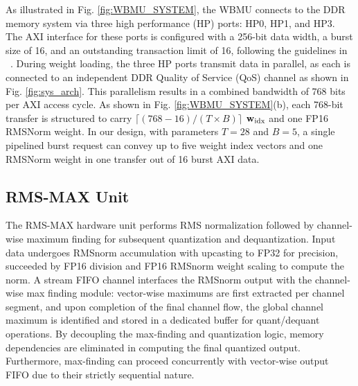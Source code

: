 \documentclass[sigconf]{acmart}
\begin{document}
As illustrated in Fig. \ref{fig:WBMU_SYSTEM}, the WBMU connects to the DDR memory system via three high performance (HP) ports: HP0, HP1, and HP3. The AXI interface for these ports is configured with a 256-bit data width, a burst size of 16, and an outstanding transaction limit of 16, following the guidelines in ~\cite{Benchmark_AXI_ON_ZYNQ}.
During weight loading, the three HP ports transmit data in parallel, as each is connected to an independent DDR Quality of Service (QoS) channel as shown in Fig. \ref{fig:sys_arch}. This parallelism results in a combined bandwidth of 768 bits per AXI access cycle. As shown in Fig. \ref{fig:WBMU_SYSTEM}(b), each 768-bit transfer is structured to carry $\lceil (768 - 16) / (T \times B)\rceil$ ${\bf w}_{\text{idx}}$ and one FP16 RMSNorm weight. In our design, with parameters $T=28$ and $B=5$, a single pipelined burst request can convey up to five weight index vectors and one RMSNorm weight in one transfer out of 16 burst AXI data. 

\subsection{RMS-MAX Unit}
The RMS-MAX hardware unit performs RMS normalization followed by channel-wise maximum finding for subsequent quantization and dequantization. Input data undergoes RMSnorm accumulation with upcasting to FP32 for precision, succeeded by FP16 division and FP16 RMSnorm weight scaling to compute the norm. A stream FIFO channel interfaces the RMSnorm output with the channel-wise max finding module: vector-wise maximums are first extracted per channel segment, and upon completion of the final channel flow, the global channel maximum is identified and stored in a dedicated buffer for quant/dequant operations. By decoupling the max-finding and quantization logic, memory dependencies are eliminated in computing the final quantized output. Furthermore, max-finding can proceed concurrently with vector-wise output FIFO due to their strictly sequential nature.
\end{document}
